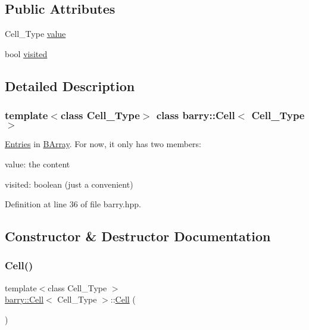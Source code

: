 \subsection*{Public Attributes}
\begin{DoxyCompactItemize}
\item 
Cell\+\_\+\+Type \hyperlink{classbarry_1_1_cell_a52918ded332c6a12109b5962d6bf3ae9}{value}
\item 
bool \hyperlink{classbarry_1_1_cell_ad7800879e5079e6b5a3982827adc38c1}{visited}
\end{DoxyCompactItemize}


\subsection{Detailed Description}
\subsubsection*{template$<$class Cell\+\_\+\+Type$>$\newline
class barry\+::\+Cell$<$ Cell\+\_\+\+Type $>$}

\hyperlink{classbarry_1_1_entries}{Entries} in \hyperlink{classbarry_1_1_b_array}{B\+Array}. For now, it only has two members\+: 


\begin{DoxyItemize}
\item value\+: the content
\item visited\+: boolean (just a convenient) 
\end{DoxyItemize}

Definition at line 36 of file barry.\+hpp.



\subsection{Constructor \& Destructor Documentation}
\mbox{\label{classbarry_1_1_cell_aa7beee933fc291cbc4ac84ec3ab63352}} 
\subsubsection{\texorpdfstring{Cell()}{Cell()}\hspace{0.1cm}{\footnotesize\ttfamily [1/6]}}
{\footnotesize\ttfamily template$<$class Cell\+\_\+\+Type $>$ \\
\hyperlink{classbarry_1_1_cell}{barry\+::\+Cell}$<$ Cell\+\_\+\+Type $>$\+::\hyperlink{classbarry_1_1_cell}{Cell} (\begin{DoxyParamCaption}{ }\end{DoxyParamCaption})}


